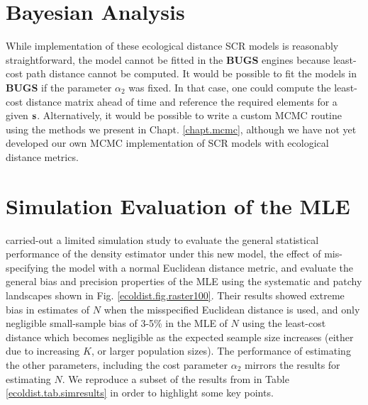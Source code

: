 \section{Bayesian Analysis}

While implementation of these ecological distance SCR models is
reasonably straightforward, the model cannot be fitted
in the  {\bf BUGS} engines because least-cost path distance cannot be computed.
It would be possible to fit the models
in {\bf BUGS} if the parameter $\alpha_{2}$ was fixed. In that case,
one could compute the least-cost distance matrix ahead of time and reference the
required elements for a given ${\bf s}$.
Alternatively, it would be possible to write a custom MCMC routine
using the methods we present in Chapt. \ref{chapt.mcmc}, although we
have not yet developed our own MCMC implementation of SCR models with
ecological distance metrics.


\section{Simulation Evaluation of the MLE}

\citet{royle_etal:2012ecol}
carried-out a limited simulation study to evaluate the
general statistical performance of the density estimator under
this new model, the effect of mis-specifying the model with a
normal Euclidean distance metric, and evaluate the general bias and
precision properties of the MLE using the systematic and patchy
landscapes shown in
Fig. \ref{ecoldist.fig.raster100}.
Their results showed extreme
bias in estimates of $N$ when the misspecified Euclidean distance is
used, and only negligible small-sample
 bias of 3-5\% in the MLE of $N$ using the
least-cost distance which becomes negligible as the expected seample
size increases (either due to increasing $K$, or larger population sizes).
The performance of estimating the other parameters, including the
cost parameter $\alpha_{2}$ mirrors
the results for estimating $N$.
We reproduce a subset of the results from \citet{royle_etal:2012ecol}
in Table \ref{ecoldist.tab.simresults} in order to highlight some key points.

